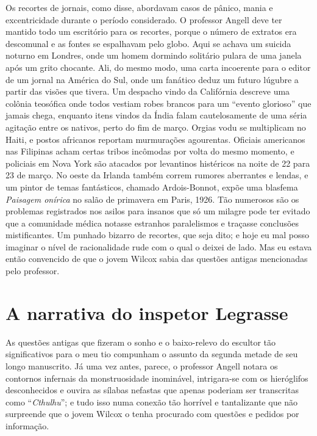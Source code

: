 Os recortes de jornais, como disse, abordavam casos de pânico, mania e
excentricidade durante o período considerado. O professor Angell deve
ter mantido todo um escritório para os recortes, porque o número de
extratos era descomunal e as fontes se espalhavam pelo globo. Aqui se
achava um suicida noturno em Londres, onde um homem dormindo solitário
pulara de uma janela após um grito chocante. Ali, do mesmo modo, uma
carta incoerente para o editor de um jornal na América do Sul, onde um
fanático deduz um futuro lúgubre a partir das visões que tivera. Um
despacho vindo da Califórnia descreve uma colônia teosófica onde todos
vestiam robes brancos para um ``evento glorioso'' que jamais chega,
enquanto itens vindos da Índia falam cautelosamente de uma séria
agitação entre os nativos, perto do fim de março. Orgias vodu se
multiplicam no Haiti, e postos africanos reportam murmurações
agourentas. Oficiais americanos nas Filipinas acham certas tribos
incômodas por volta do mesmo momento, e policiais em Nova York são
atacados por levantinos histéricos na noite de 22 para 23 de março. No
oeste da Irlanda também correm rumores aberrantes e lendas, e um pintor
de temas fantásticos, chamado Ardois-Bonnot, expõe uma blasfema
\emph{Paisagem onírica} no salão de primavera em Paris, 1926. Tão numerosos
são os problemas registrados nos asilos para insanos que só um milagre
pode ter evitado que a comunidade médica notasse estranhos paralelismos
e traçasse conclusões mistificantes. Um punhado bizarro de recortes, que
seja dito; e hoje eu mal posso imaginar o nível de racionalidade rude
com o qual o deixei de lado. Mas eu estava então convencido de que o jovem
Wilcox sabia das questões antigas mencionadas pelo professor.


\chapter{A narrativa do inspetor Legrasse}

\noindent{}As questões antigas que fizeram o sonho e o baixo-relevo do escultor tão
significativos para o meu tio compunham o assunto da segunda metade de
seu longo manuscrito. Já uma vez antes, parece, o professor Angell
notara os contornos infernais da monstruosidade inominável, intrigara-se
com os hieróglifos desconhecidos e ouvira as sílabas nefastas que apenas
poderiam ser transcritas como ``\emph{Cthulhu}''; e tudo isso numa
conexão tão horrível e tantalizante que não surpreende que o
jovem Wilcox o tenha procurado com questões e pedidos por informação.

